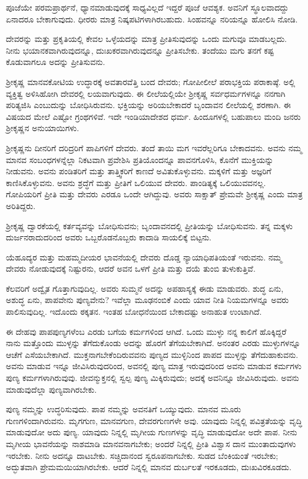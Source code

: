 ಪೂಜೆಯೇ ಪರಮಪ್ರಾರ್ಥನೆ, ಧ್ಯಾನಮಾಡುವುದಕ್ಕೆ ಸಾಧ್ಯವಿಲ್ಲದೆ ಇದ್ದರೆ ಪೂಜೆ ಆವಶ್ಯಕ. ಅವನಿಗೆ ಸ್ಥೂಲವಾದದ್ದು ಏನಾದರೂ ಬೇಕಾಗುವುದು. ಧೀರರು ಮಾತ್ರ ನಿಷ್ಕಪಟಿಗಳಾಗಿರಬಹುದು. ಸಿಂಹವನ್ನೂ ನರಿಯನ್ನೂ ಹೋಲಿಸಿ ನೋಡಿ.

ದೇವರನ್ನು ಮತ್ತು ಪ್ರಕೃತಿಯಲ್ಲಿ ಕೇವಲ ಒಳ್ಳೆಯದನ್ನು ಮಾತ್ರ ಪ್ರೀತಿಸುವುದನ್ನು ಒಂದು ಮಗುವೂ ಮಾಡಬಲ್ಲದು. ನೀನು ಭಯಾನಕವಾಗಿರುವುದನ್ನೂ, ದುಃಖಕರವಾಗಿರುವುದನ್ನೂ ಪ್ರೀತಿಸಬೇಕು. ತಂದೆಯು ಮಗು ತನಗೆ ಕಷ್ಟ ಕೊಡುವಾಗಲೂ ಅದನ್ನು ಪ್ರೀತಿಸುವನು.

ಶ‍್ರೀಕೃಷ್ಣ ಮಾನವಕೋಟಿಯ ಉದ್ಧಾರಕ್ಕೆ ಅವತಾರವೆತ್ತಿ ಬಂದ ದೇವರು; ಗೋಪೀಲೀಲೆ ಪರಾಭಕ್ತಿಯ ಪರಾಕಾಷ್ಠೆ. ಅಲ್ಲಿ ವ್ಯಕ್ತಿತ್ವ ಅಳಿಸಿಹೋಗಿ ದೇವರಲ್ಲಿ ಲಯವಾಗುವುದು. ಈ ಲೀಲೆಯಲ್ಲಿಯೇ ಶ‍್ರೀಕೃಷ್ಣ ಸರ್ವಧರ್ಮಗಳನ್ನೂ ನನಗಾಗಿ ಪರಿತ್ಯಜಿಸಿ ಎಂಬುದುನ್ನು ಬೋಧಿಸಿರುವನು. ಭಕ್ತಿಯನ್ನು ಅರಿಯಬೇಕಾದರೆ ಬೃಂದಾವನ ಲೀಲೆಯಲ್ಲಿ ಶರಣಾಗಿ. ಈ ವಿಷಯದ ಮೇಲೆ ಎಷ್ಟೋ ಗ್ರಂಥಗಳಿವೆ. ಇದೇ ಇಂಡಿಯಾದೇಶದ ಧರ್ಮ. ಹಿಂದೂಗಳಲ್ಲಿ ಬಹುಪಾಲು ಮಂದಿ ಜನರು ಶ‍್ರೀಕೃಷ್ಣನ ಅನುಯಾಯಿಗಳು.

ಶ‍್ರೀಕೃಷ್ಣನು ದೀನರಿಗೆ ದರಿದ್ರರಿಗೆ ಪಾಪಿಗಳಿಗೆ ದೇವರು. ತಂದೆ ತಾಯಿ ಮಗ ಇವರೆಲ್ಲರಿಗೂ ಬೇಕಾದವನು. ಅವನು ನಮ್ಮ ಮಾನವ ಸಂಬಂಧಗಳನ್ನೆಲ್ಲಾ ನಿಕಟವಾಗಿ ಪ್ರವೇಶಿಸಿ ಪ್ರತಿಯೊಂದನ್ನೂ ಪಾವನಗೊಳಿಸಿ, ಕೊನೆಗೆ ಮುಕ್ತಿಯನ್ನು ನೀಡುವನು. ಅವನು ಪಂಡಿತರಿಗೆ ಮತ್ತು ತಾತ್ತ್ವಿಕರಿಗೆ ಕಾಣದೆ ಅವಿತುಕೊಳ್ಳುವನು. ಮಕ್ಕಳಿಗೆ ಮತ್ತು ಅಜ್ಞರಿಗೆ ಕಾಣಿಸಿಕೊಳ್ಳುವನು. ಅವನು ಶ್ರದ್ಧೆಗೆ ಮತ್ತು ಪ್ರೀತಿಗೆ ಒಲಿಯುವ ದೇವರು. ಪಾಂಡಿತ್ಯಕ್ಕೆ ಒಲಿಯುವವನಲ್ಲ. ಗೋಪಿಯರಿಗೆ ಪ್ರೀತಿ ಮತ್ತು ದೇವರು ಎರಡೂ ಒಂದೇ ಆಗಿದ್ದುವು. ಅವರು ಸಾಕ್ಷಾತ್ ಪ್ರೇಮವೇ ಶ‍್ರೀಕೃಷ್ಣ ಎಂದು ಮಾತ್ರ ಅರಿತಿದ್ದರು.

ಶ‍್ರೀಕೃಷ್ಣ ದ್ವಾರಕೆಯಲ್ಲಿ ಕರ್ತವ್ಯವನ್ನು ಬೋಧಿಸುವನು; ಬೃಂದಾವನದಲ್ಲಿ ಪ್ರೀತಿಯನ್ನು ಬೋಧಿಸುವನು. ತನ್ನ ಮಕ್ಕಳು ದುರ್ಜನರಾದುದರಿಂದ ಅವರು ಒಬ್ಬರೊಡನೊಬ್ಬರು ಕಾದಾಡಿ ಸಾಯಲಿಕ್ಕೆ ಬಿಟ್ಟನು.

ಯೆಹೂದ್ಯರ ಮತ್ತು ಮಹಮ್ಮದೀಯರ ಭಾವನೆಯಲ್ಲಿ ದೇವರು ದೊಡ್ಡ ನ್ಯಾಯಾಧಿಪತಿಯಂತೆ ಇರುವನು. ನಮ್ಮ ದೇವರು ನೋಡುವುದಕ್ಕೆ ನಿಷ್ಟುರನು, ಆದರೆ ಅವನ ಒಳಗೆ ಪ್ರೀತಿ ಮತ್ತು ದಯೆ ತುಂಬಿ ತುಳುಕುತ್ತಿವೆ.

ಕೆಲವರಿಗೆ ಅದ್ವೈತ ಗೊತ್ತಾಗುವುದಿಲ್ಲ. ಅವರು ಸುಮ್ಮನೆ ಅದನ್ನು ಅಪಹಾಸ್ಯಕ್ಕೆ ಈಡು ಮಾಡುವರು. ಶುದ್ಧ ಏನು, ಅಶುದ್ಧ ಏನು, ಪಾಪವೇನು ಪುಣ್ಯವೇನು? ಇವೆಲ್ಲಾ ಮೂಢನಂಬಿಕೆ ಎಂದು ಯಾವ ನೀತಿ ನಿಯಮಗಳನ್ನೂ ಅವರು ಪಾಲಿಸುವುದಿಲ್ಲ. ಇದೊಂದು ಠಕ್ಕತನ. ಇಂತಹ ಬೋಧನೆಯಿಂದ ಬೇಕಾದಷ್ಟು ಅನಾಹುತ ಉಂಟಾಗಿದೆ.

ಈ ದೇಹವು ಪಾಪಪುಣ್ಯಗಳೆಂಬ ಎರಡು ಬಗೆಯ ಕರ್ಮಗಳಿಂದ ಆಗಿದೆ. ಒಂದು ಮುಳ್ಳು ನನ್ನ ಕಾಲಿಗೆ ಹೊಕ್ಕಿದ್ದರೆ ನಾನು ಮತ್ತೊಂದು ಮುಳ್ಳನ್ನು ತೆಗೆದುಕೊಂಡು ಅದನ್ನು ಹೊರಗೆ ತೆಗೆಯಬೇಕಾಗಿದೆ. ಅನಂತರ ಎರಡು ಮುಳ್ಳುಗಳನ್ನೂ ಆಚೆಗೆ ಎಸೆಯಬೇಕಾಗಿದೆ. ಮುಕ್ತನಾಗಬೇಕೆಂದಿರುವವನು ಪುಣ್ಯದ ಮುಳ್ಳಿನಿಂದ ಪಾಪದ ಮುಳ್ಳನ್ನು ತೆಗೆದುಹಾಕುವನು. ಅವನು ಮಾಡುವ ಇನ್ನೂ ಜೀವಿಸಿರುವುದರಿಂದ, ಅವನಲ್ಲಿ ಪುಣ್ಯ ಮಾತ್ರ ಇರುವುದರಿಂದ ಅವನು ಮಾಡುವ ಕರ್ಮಗಳು ಪುಣ್ಯ ಕರ್ಮಗಳಾಗಿರುವುವು. ಜೀವನ್ಮುಕ್ತನಲ್ಲಿ ಸ್ವಲ್ಪ ಪುಣ್ಯ ಮಿಕ್ಕಿರುವುದು; ಅದಕ್ಕೆ ಅವನಿನ್ನೂ ಜೀವಿಸಿರುವುದು. ಅವನು ಮಾಡುವುದೆಲ್ಲಾ ಪುಣ್ಯವಾಗಿರಬೇಕು.

ಪುಣ್ಯ ನಮ್ಮನ್ನು ಉದ್ಧರಿಸುವುದು. ಪಾಪ ನಮ್ಮನ್ನು ಅವನತಿಗೆ ಒಯ್ಯುವುದು. ಮಾನವ ಮೂರು ಗುಣಗಳಿಂದಾಗಿರುವನು. ಮೃಗಗುಣ, ಮಾನವಗುಣ, ದೇವರಗುಣಗಳೇ ಅವು. ಯಾವುದು ನಿನ್ನಲ್ಲಿ ಪವಿತ್ರತೆಯನ್ನು ವೃದ್ಧಿ ಮಾಡುವುದೋ ಅದು ಪುಣ್ಯ. ಯಾವುದು ನಿನ್ನಲ್ಲಿ ಮೃಗೀಯ ಗುಣಗಳನ್ನು ವೃದ್ಧಿ ಮಾಡುವುದೋ ಅದೇ ಪಾಪ. ನೀನು ಮೃಗೀಯ ಭಾವನೆಯನ್ನು ನಾಶಮಾಡಿ ಮಾನವನಾಗಬೇಕು; ಅಂದರೆ ನಿನ್ನಲ್ಲಿ ಪ್ರೀತಿ ವಿಶ್ವಾಸ ದಾನ ಮುಂತಾದುವುಗಳು ಇರಬೇಕು. ನೀನು ಅದನ್ನೂ ದಾಟಬೇಕು. ಸಚ್ಚಿದಾನಂದ ಸ್ವರೂಪನಾಗಬೇಕು. ಸುಡದ ಬೆಂಕಿಯಂತೆ ಇರಬೇಕು; ಅದ್ಭುತವಾಗಿ ಪ್ರೇಮಮಯಿಯಾಗಿರಬೇಕು. ಆದರೆ ನಿನ್ನಲ್ಲಿ ಮಾನವ ದುರ್ಬಲತೆ ಇರಕೂಡದು, ದುಃಖವಿರಕೂಡದು.

